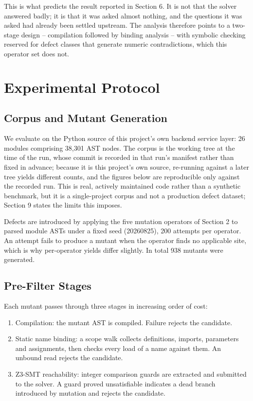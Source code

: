 \documentclass[10pt,twocolumn,letterpaper]{article}
\begin{document}
This is what predicts the result reported in Section 6. It is not that the solver
answered badly; it is that it was asked almost nothing, and the questions it was
asked had already been settled upstream. The analysis therefore points to a
two-stage design -- compilation followed by binding analysis -- with symbolic
checking reserved for defect classes that generate numeric contradictions, which
this operator set does not.




\section{Experimental Protocol}



\subsection{Corpus and Mutant Generation}


We evaluate on the Python source of this project's own backend service layer: 26 modules comprising 38{,}301 AST nodes. The corpus is the working tree at the time of the run, whose commit is recorded in that run's manifest rather than fixed in advance; because it is this project's own source, re-running against a later tree yields different counts, and the figures below are reproducible only against the recorded run. This is real, actively maintained code rather than a synthetic benchmark, but it is a single-project corpus and not a production defect dataset; Section 9 states the limits this imposes.

Defects are introduced by applying the five mutation operators of Section 2 to parsed module ASTs under a fixed seed (20260825), 200 attempts per operator. An attempt fails to produce a mutant when the operator finds no applicable site, which is why per-operator yields differ slightly. In total 938 mutants were generated.


\subsection{Pre-Filter Stages}


Each mutant passes through three stages in increasing order of cost:
\begin{enumerate}
  \item Compilation: the mutant AST is compiled. Failure rejects the candidate.
  \item Static name binding: a scope walk collects definitions, imports, parameters and assignments, then checks every load of a name against them. An unbound read rejects the candidate.
  \item Z3-SMT reachability: integer comparison guards are extracted and submitted to the solver. A guard proved unsatisfiable indicates a dead branch introduced by mutation and rejects the candidate.
\end{enumerate}
\end{document}

